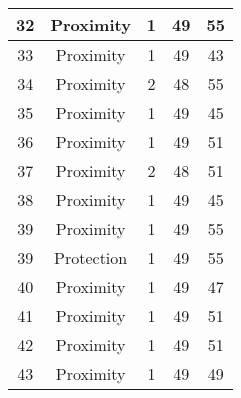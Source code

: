 \documentclass[results.tex]{subfiles}
\begin{document}
\begin{center}
\begin{tabular}{| c || c | c | c | c |}
            \hline
            32                      & Proximity                    & 1                      & 49                      & 55                   \\
            \hline
            33                      & Proximity                    & 1                      & 49                      & 43                   \\
            \hline
            34                      & Proximity                    & 2                      & 48                      & 55                   \\
            \hline
            35                      & Proximity                    & 1                      & 49                      & 45                   \\
            \hline
            36                      & Proximity                    & 1                      & 49                      & 51                   \\
            \hline
            37                      & Proximity                    & 2                      & 48                      & 51                   \\
            \hline
            38                      & Proximity                    & 1                      & 49                      & 45                   \\
            \hline
            39                      & Proximity                    & 1                      & 49                      & 55                   \\
            \hline
            39                      & Protection                   & 1                      & 49                      & 55                   \\
            \hline
            40                      & Proximity                    & 1                      & 49                      & 47                   \\
            \hline
            41                      & Proximity                    & 1                      & 49                      & 51                   \\
            \hline
            42                      & Proximity                    & 1                      & 49                      & 51                   \\
            \hline
            43                      & Proximity                    & 1                      & 49                      & 49                   \\

\end{tabular}
\end{center}
\end{document}
